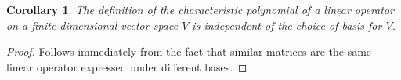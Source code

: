 \documentclass[12pt]{article}
\theoremstyle{plain}
\newtheorem{corollary}[theorem]{Corollary}
\theoremstyle{definition}
\theoremstyle{remark}
\begin{document}
\begin{corollary}
The definition of the characteristic polynomial of a linear operator on a finite-dimensional vector space $V$ is independent of the choice of basis for $V$.
\end{corollary}

\begin{proof}
Follows immediately from the fact that similar matrices are the same linear operator expressed under different bases.
\end{proof}
\end{document}
